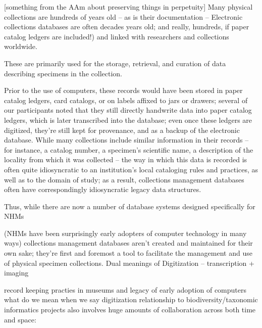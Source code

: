 [something from the AAm about preserving things in perpetuity] Many physical collections are hundreds of years old -- as is their documentation -- 
Electronic collections databases are often decades years old; and really, hundreds, if paper catalog ledgers are included!) and linked with researchers and collections worldwide.  


These are primarily used for the storage, retrieval, and curation of data describing specimens in the collection.

Prior to the use of computers, these records would have been stored in paper catalog ledgers, card catalogs, or on labels affixed to jars or drawers; several of our participants noted that they still directly handwrite data into paper catalog ledgers, which is later transcribed into the database; even once these ledgers are digitized, they’re still kept for provenance, and as a backup of the electronic database. While many collections include similar information in their records – for instance, a catalog number, a specimen’s scientific name, a description of the locality from which it was collected – the way in which this data is recorded is often quite idiosyncratic to an institution’s local cataloging rules and practices, as well as to the domain of study; as a result, collections management databases often have correspondingly idiosyncratic legacy data structures.

Thus, while there are now a number of database systems designed specifically for NHMs

(NHMs have been surprisingly early adopters of computer technology in many ways)
collections management databases aren’t created and maintained for their own sake; they’re first and foremost a tool to facilitate the management and use of physical specimen collections. 
Dual meanings of Digitization – transcription + imaging


record keeping practies in museums and legacy of early adoption of computers
what do we mean when we say digitization
relationship to biodiversity/taxonomic informatics projects
also involves huge amounts of collaboration across both time and space:
